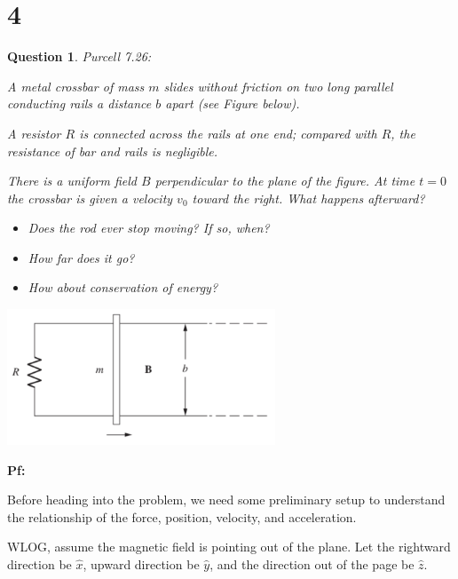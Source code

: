 \documentclass{article}
\newtheorem{question}{Question}
\begin{document}
\section*{4}
\begin{myBox}[]{}
    \begin{question}
        Purcell 7.26:

        A metal crossbar of mass $m$ slides without friction on two long
        parallel conducting rails a distance $b$ apart (see Figure below). 
        
        A resistor $R$ is connected across the rails at one end; compared with $R$, 
        the resistance of bar and rails is negligible. 
        
        There is a uniform field $B$ perpendicular to the plane of the figure. 
        At time $t = 0$ the crossbar is given a velocity $v_0$ toward the right. 
        What happens afterward?

        \begin{itemize}
            \item[(a)]Does the rod ever stop moving? If so, when?
            \item[(b)]How far does it go?
            \item[(c)] How about conservation of energy?
        \end{itemize}
    \end{question}

    \begin{center}
        \includegraphics*[width=80mm]{7.25.png}
    \end{center}
\end{myBox}

\textbf{Pf:}

Before heading into the problem, we need some preliminary setup to understand the relationship of the force, position, velocity, and acceleration.

\hfill

WLOG, assume the magnetic field is pointing out of the plane. Let the rightward direction be $\hat{x}$, upward direction be $\hat{y}$, and the direction out of the page be $\hat{z}$.
\end{document}
